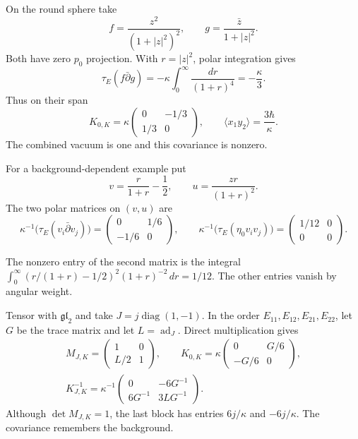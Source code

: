\begin{example}\label{mht:ex:native-gaussian-pair}
On the round sphere take
\[
 f=\frac{z^2}{(1+|z|^2)^2},\qquad
 g=\frac{\bar z}{1+|z|^2}.
\]
Both have zero $p_0$ projection. With $r=|z|^2$, polar integration
gives
\[
 \tau_E(f\bar\partial g)
       =-\kappa\int_0^\infty\frac{dr}{(1+r)^4}
       =-\frac\kappa3.
\]
Thus on their span
\[
 K_{0,K}=\kappa\begin{pmatrix}0&-1/3\\1/3&0\end{pmatrix},
 \qquad \langle x_1y_2\rangle=\frac{3\hbar}{\kappa}.
\]
The combined vacuum is one and this covariance is nonzero.

For a background-dependent example put
\[
 v=\frac r{1+r}-\frac12,\qquad
 u=\frac{zr}{(1+r)^2}.
\]
The two polar matrices on $(v,u)$ are
\[
 \kappa^{-1}\bigl(\tau_E(v_i\bar\partial v_j)\bigr)
    =\begin{pmatrix}0&1/6\\-1/6&0\end{pmatrix},\qquad
\kappa^{-1}\bigl(\tau_E(\eta_0v_iv_j)\bigr)
    =\begin{pmatrix}1/12&0\\0&0\end{pmatrix}.
\]

The nonzero entry of the second matrix is the integral
$\int_0^\infty(r/(1+r)-1/2)^2(1+r)^{-2}\,dr=1/12$.
The other entries vanish by angular weight.

Tensor with $\mathfrak{gl}_2$ and take $J=j\operatorname{diag}(1,-1)$.
In the order $E_{11},E_{12},E_{21},E_{22}$, let $G$ be the trace
matrix and let $L=\operatorname{ad}_J$. Direct multiplication gives
\begin{equation}\label{mht:eq:matrix-gaussian-inverse}
 \begin{gathered}
 M_{J,K}=\begin{pmatrix}1&0\\L/2&1\end{pmatrix},\qquad
 K_{0,K}=\kappa\begin{pmatrix}0&G/6\\-G/6&0\end{pmatrix},\\
 K_{J,K}^{-1}=\kappa^{-1}
       \begin{pmatrix}0&-6G^{-1}\\6G^{-1}&3LG^{-1}\end{pmatrix}.
 \end{gathered}
\end{equation}
Although $\det M_{J,K}=1$, the last block has entries
$6j/\kappa$ and $-6j/\kappa$. The covariance remembers the background.
\end{example}


